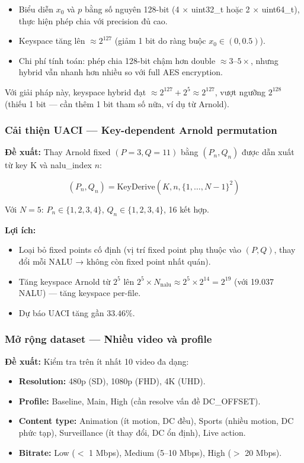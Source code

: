 \begin{itemize}
  \item Biểu diễn $x_0$ và $p$ bằng số nguyên 128-bit (4 $\times$ uint32\_t hoặc
        2 $\times$ uint64\_t), thực hiện phép chia với precision đủ cao.
  \item Keyspace tăng lên $\approx 2^{127}$ (giảm 1 bit do ràng buộc $x_0 \in (0, 0.5)$).
  \item Chi phí tính toán: phép chia 128-bit chậm hơn double $\approx 3$--$5\times$,
        nhưng hybrid vẫn nhanh hơn nhiều so với full AES encryption.
\end{itemize}

Với giải pháp này, keyspace hybrid đạt $\approx 2^{127} + 2^5 \approx 2^{127}$,
vượt ngưỡng $2^{128}$ (thiếu 1 bit --- cần thêm 1 bit tham số nữa, ví dụ từ Arnold).

\subsubsection{Cải thiện UACI --- Key-dependent Arnold permutation}

\textbf{Đề xuất:} Thay Arnold fixed $(P=3, Q=11)$ bằng $(P_n, Q_n)$ được dẫn xuất
từ key K và nalu\_index $n$:

\begin{equation}
(P_n, Q_n) = \text{KeyDerive}(K, n, \{1,\ldots,N-1\}^2)
\end{equation}

Với $N = 5$: $P_n \in \{1, 2, 3, 4\}$, $Q_n \in \{1, 2, 3, 4\}$, 16 kết hợp.

\textbf{Lợi ích:}
\begin{itemize}
  \item Loại bỏ fixed points cố định (vị trí fixed point phụ thuộc vào $(P, Q)$,
        thay đổi mỗi NALU → không còn fixed point nhất quán).
  \item Tăng keyspace Arnold từ $2^5$ lên $2^5 \times N_{\text{nalu}} \approx 2^5 \times 2^{14} = 2^{19}$
        (với 19.037 NALU) --- tăng keyspace per-file.
  \item Dự báo UACI tăng gần $33.46\%$.
\end{itemize}

\subsubsection{Mở rộng dataset --- Nhiều video và profile}

\textbf{Đề xuất:} Kiểm tra trên ít nhất 10 video đa dạng:
\begin{itemize}
  \item \textbf{Resolution:} 480p (SD), 1080p (FHD), 4K (UHD).
  \item \textbf{Profile:} Baseline, Main, High (cần resolve vấn đề DC\_OFFSET).
  \item \textbf{Content type:} Animation (ít motion, DC đều), Sports (nhiều motion,
        DC phức tạp), Surveillance (ít thay đổi, DC ổn định), Live action.
  \item \textbf{Bitrate:} Low ($<$ 1 Mbps), Medium (5--10 Mbps), High ($>$ 20 Mbps).
\end{itemize}

